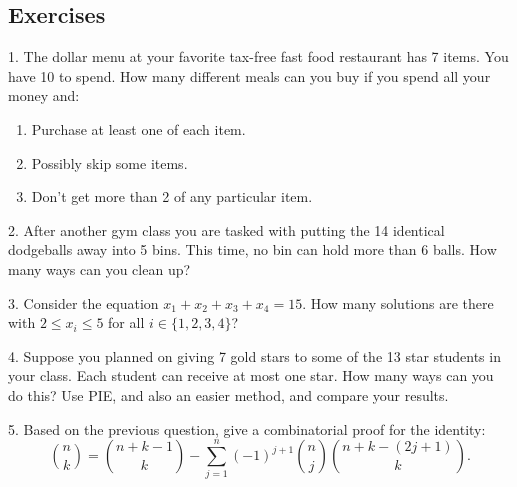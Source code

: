 \documentclass[10pt,]{book}
\theoremstyle{plain}
\theoremstyle{definition}
\theoremstyle{definition}
\theoremstyle{definition}
\numberwithin{equation}{section}
\begin{document}
\subsection[Exercises]{Exercises}\label{exercises-9}
\begin{exerciselist}
\item[1.]\hypertarget{exercise-92}{}
            The dollar menu at your favorite tax-free fast food restaurant has 7 items. You have
            \textdollar{}10 to spend. How many different meals can you buy if you spend all your money and:
\leavevmode%
\begin{enumerate}[label=(\alph*)]
\item\hypertarget{li-639}{}
                Purchase at least one of each item.
\item\hypertarget{li-640}{}
                Possibly skip some items.
\item\hypertarget{li-641}{}
                Don't get more than 2 of any particular item.
\end{enumerate}
\par\smallskip
\item[2.]\hypertarget{exercise-93}{}
            After another gym class you are tasked with putting the 14 identical dodgeballs away into 5 bins. This time, no bin can hold more than 6 balls. How many ways can you clean up?
\par\smallskip
\item[3.]\hypertarget{exercise-94}{}
            Consider the equation \(x_1 + x_2 + x_3 + x_4 = 15\). How many solutions are there with \(2 \le x_i \le 5\) for all \(i \in \{1,2,3,4\}\)?
\par\smallskip
\item[4.]\hypertarget{exercise-95}{}
            Suppose you planned on giving 7 gold stars to some of the 13 star students in your class. Each student can receive at most one star. How many ways can you do this? Use PIE, and also an easier method, and compare your results.
\par\smallskip
\item[5.]\hypertarget{exercise-96}{}
            Based on the previous question, give a combinatorial proof for the identity:
            \begin{equation*}
              {n \choose k} = {n+k-1 \choose k} - \sum_{j=1}^n (-1)^{j+1}{n \choose j}{n+k-(2j+1) \choose k}.
            \end{equation*}

\end{exerciselist}
\end{document}
